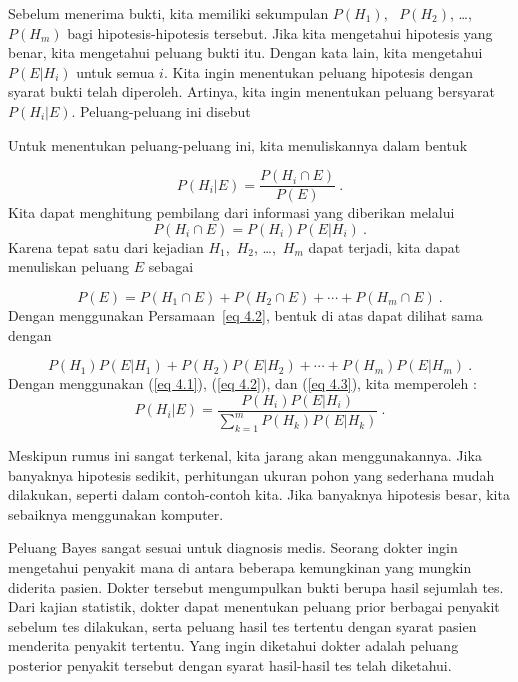 Sebelum menerima bukti, kita memiliki sekumpulan  $P(H_1)$,                \hfill\break
~$P(H_2)$, \dots,~$P(H_m)$ bagi hipotesis-hipotesis tersebut. 
Jika kita mengetahui hipotesis yang benar, kita mengetahui peluang bukti itu.  Dengan
kata lain, kita mengetahui $P(E|H_i)$ untuk semua $i$.  Kita ingin menentukan peluang
hipotesis dengan syarat bukti telah diperoleh.  Artinya, kita ingin menentukan peluang
bersyarat $P(H_i|E)$.  Peluang-peluang ini disebut 

Untuk menentukan peluang-peluang ini, kita menuliskannya dalam bentuk

\begin{equation}
P(H_i|E) = \frac{P(H_i \cap E)}{P(E)}\ . \label{eq 4.1}
\end{equation}
Kita dapat menghitung pembilang dari informasi yang diberikan melalui
\begin{equation}
P(H_i \cap E) = P(H_i)P(E|H_i)\ . \label{eq 4.2}  
\end{equation}
Karena tepat satu dari kejadian $H_1$,~$H_2$, \dots,~$H_m$ dapat terjadi, kita
dapat menuliskan peluang $E$ sebagai

$$
P(E) = P(H_1 \cap E)  + P(H_2 \cap E)  + \cdots + P(H_m \cap E)\ .
$$
Dengan menggunakan Persamaan~\ref{eq 4.2}, bentuk di atas dapat dilihat sama dengan

\begin{equation}
   P(H_1)P(E|H_1) + P(H_2)P(E|H_2) + \cdots + P(H_m)P(E|H_m) \ .
\label{eq 4.3}                                               
\end{equation}
Dengan menggunakan (\ref{eq 4.1}), (\ref{eq 4.2}), dan (\ref{eq 4.3}),
kita memperoleh :
$$
P(H_i|E) = \frac{P(H_i)P(E|H_i)}{\sum_{k = 1}^m P(H_k)P(E|H_k)}\ .
$$

Meskipun rumus ini sangat terkenal, kita jarang akan menggunakannya.  Jika banyaknya
hipotesis sedikit, perhitungan ukuran pohon yang sederhana mudah
dilakukan, seperti dalam contoh-contoh kita.  Jika banyaknya hipotesis besar, kita sebaiknya
menggunakan komputer.
\par
Peluang Bayes sangat sesuai untuk diagnosis medis.  Seorang
dokter ingin mengetahui penyakit mana di antara beberapa kemungkinan yang mungkin diderita pasien.  Dokter tersebut
mengumpulkan bukti berupa hasil sejumlah tes.  Dari
kajian statistik, dokter dapat menentukan peluang prior berbagai
penyakit sebelum tes dilakukan, serta peluang hasil tes tertentu
dengan syarat pasien menderita penyakit tertentu.  Yang ingin diketahui dokter adalah peluang
posterior penyakit tersebut dengan syarat hasil-hasil tes telah diketahui.

